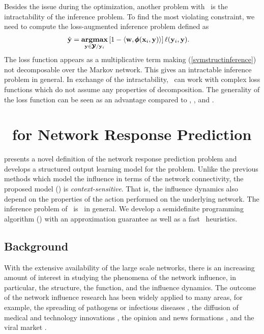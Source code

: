 {Besides the issue during the optimization, another problem with \svmstruct\ is the intractability of the inference problem.
To find the most violating constraint, we need to compute the loss-augmented inference problem \citep{TJTA05} defined as
\begin{align}
	\hat{\mathbf {y}} = \underset{\mathbf {y}\in\pmb {\mathcal{Y}}/\mathbf {y}_i}{\textbf{argmax}} &\, [1-\langle \mathbf {w}, \pmb \phi(\mathbf {x}_i,\mathbf {y}) \rangle]\,\mathbf {\ell}(\mathbf {y}_i,\mathbf {y}). \label{svmstructinference}
\end{align}
The loss function appears as a multiplicative term making (\ref{svmstructinference}) not decomposable over the Markov network.
This gives an intractable inference problem in general.
In exchange of the intractability, \svmstruct\ can work with complex loss functions which do not assume any properties of decomposition.
The generality of the loss function can be seen as an advantage compared to \crf, \mmmn, and \mmcrf.



%
%
\section{\spin\ for Network Response Prediction} \label{sc_su14a}

 presents a novel definition of the network response prediction problem and develops a structured output learning model for the problem.
Unlike the previous methods which model the influence in terms of the network connectivity, the proposed model (\spin) is \textit{context-sensitive}. 
That is, the influence dynamics also depend on the properties of the action performed on the underlying network.
The inference problem of \spin\ is \nphard\ in general.
We develop a semidefinite programming algorithm (\sdp) with an approximation guarantee as well as a fast \greedy\ heuristics.

\subsection{Background}

With the extensive availability of the large scale networks, there is an increasing amount of interest in studying the phenomena of the network influence, in particular, the structure, the function, and the influence dynamics. 
The outcome of the network influence research has been widely applied to many areas, for example, the spreading of pathogens or infectious diseases \citep{Hethcote00the,Anderson02infectious}, the diffusion of medical and technology innovations \citep{Strang98diffusion,Rogers03the}, the opinion and news formations \citep{Adar04implicit,Gruhl04information,Adar05tracking,Leskovec07cascading,Nowell08tracing,Leskovec09meme}, and the viral market \citep{Domingos01mining,Kempe03maximizing,Liben-Nowell03the}.

}
